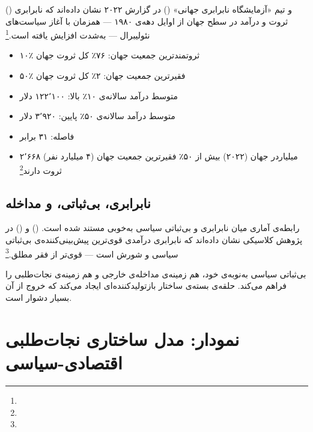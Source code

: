  () و تیم «آزمایشگاه نابرابری جهانی» () در گزارش ۲۰۲۲ نشان داده‌اند که نابرابری ثروت و درآمد در سطح جهان از اوایل دهه‌ی ۱۹۸۰ — همزمان با آغاز سیاست‌های نئولیبرال — به‌شدت افزایش یافته است.\footnote{}

\begin{tcolorbox}[enemybox, title={ارقام نابرابری جهانی (۲۰۲۲)}]
\begin{itemize}
\item ۱۰٪ ثروتمندترین جمعیت جهان: ۷۶٪ کل ثروت جهان
\item ۵۰٪ فقیرترین جمعیت جهان: ۲٪ کل ثروت جهان
\item متوسط درآمد سالانه‌ی ۱۰٪ بالا: ۱۲۲٬۱۰۰ دلار
\item متوسط درآمد سالانه‌ی ۵۰٪ پایین: ۳٬۹۲۰ دلار
\item فاصله: ۳۱ برابر
\item ۲٬۶۶۸ میلیاردر جهان (۲۰۲۲) بیش از ۵۰٪ فقیرترین جمعیت جهان (۴ میلیارد نفر) ثروت دارند\footnote{}
\end{itemize}
\end{tcolorbox}

\subsection{نابرابری، بی‌ثباتی، و مداخله}
\label{subsec:ch12-inequality-instability}

رابطه‌ی آماری میان نابرابری و بی‌ثباتی سیاسی به‌خوبی مستند شده است.  () و  () در پژوهش کلاسیکی نشان داده‌اند که نابرابری درآمدی قوی‌ترین پیش‌بینی‌کننده‌ی بی‌ثباتی سیاسی و شورش است — قوی‌تر از فقر مطلق.\footnote{}

بی‌ثباتی سیاسی به‌نوبه‌ی خود، هم زمینه‌ی مداخله‌ی خارجی و هم زمینه‌ی نجات‌طلبی را فراهم می‌کند. حلقه‌ی بسته‌ی  ساختار بازتولیدکننده‌ای ایجاد می‌کند که خروج از آن بسیار دشوار است.


\section{نمودار: مدل ساختاری نجات‌طلبی اقتصادی-سیاسی}
\label{sec:ch12-structural-model}

